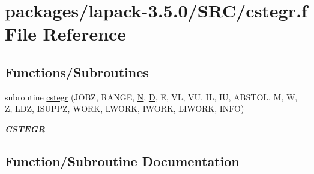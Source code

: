 \hypertarget{cstegr_8f}{}\section{packages/lapack-\/3.5.0/\+S\+R\+C/cstegr.f File Reference}
\label{cstegr_8f}
\subsection*{Functions/\+Subroutines}
\begin{DoxyCompactItemize}
\item 
subroutine \hyperlink{cstegr_8f_ae6f269ca9edc82f6b7e6d96ac65f9758}{cstegr} (J\+O\+B\+Z, R\+A\+N\+G\+E, \hyperlink{polmisc_8c_a0240ac851181b84ac374872dc5434ee4}{N}, \hyperlink{odrpack_8h_a7dae6ea403d00f3687f24a874e67d139}{D}, E, V\+L, V\+U, I\+L, I\+U, A\+B\+S\+T\+O\+L, M, W, Z, L\+D\+Z, I\+S\+U\+P\+P\+Z, W\+O\+R\+K, L\+W\+O\+R\+K, I\+W\+O\+R\+K, L\+I\+W\+O\+R\+K, I\+N\+F\+O)
\begin{DoxyCompactList}\small\item\em {\bfseries C\+S\+T\+E\+G\+R} \end{DoxyCompactList}\end{DoxyCompactItemize}


\subsection{Function/\+Subroutine Documentation}
\hypertarget{cstegr_8f_ae6f269ca9edc82f6b7e6d96ac65f9758}{}
